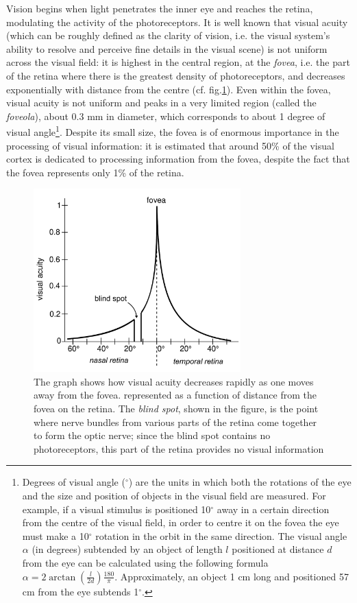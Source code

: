 \documentclass[11pt]{article}
\begin{document}
Vision begins when light penetrates the inner eye and reaches the retina, modulating the activity of the photoreceptors. It is well known that visual acuity (which can be roughly defined as the clarity of vision, i.e. the visual system's ability to resolve and perceive fine details in the visual scene) is not uniform across the visual field: it is highest in the central region, at the \textit{fovea}, i.e. the part of the retina where there is the greatest density of photoreceptors, and decreases exponentially with distance from the centre (cf. fig.\ref{fig1}). Even within the fovea, visual acuity is not uniform and peaks in a very limited region (called the \textit{foveola}), about 0.3 mm in diameter, which corresponds to about 1 degree of visual angle\footnote{Degrees of visual angle ($^{\circ}$) are the units in which both the rotations of the eye and the size and position of objects in the visual field are measured. For example, if a visual stimulus is positioned 10$^{\circ}$ away in a certain direction from the centre of the visual field, in order to centre it on the fovea the eye must make a 10$^{\circ}$ rotation in the orbit in the same direction. The visual angle $\alpha$ (in degrees) subtended by an object of length $l$ positioned at distance $d$ from the eye can be calculated using the following formula $\alpha = 2 \arctan(\frac{l}{2d}) \frac{180}{\pi}$. Approximately, an object 1 cm long and positioned 57 cm from the eye subtends 1$^{\circ}$.}. Despite its small size, the fovea is of enormous importance in the processing of visual information: it is estimated that around 50\% of the visual cortex is dedicated to processing information from the fovea, despite the fact that the fovea represents only 1\% of the retina.

\begin{figure}
\centering
\includegraphics[width=80mm]{fig1.pdf}
\caption{The graph shows how visual acuity decreases rapidly as one moves away from the fovea. represented as a function of distance from the fovea on the retina. The \textit{blind spot}, shown in the figure, is the point where nerve bundles from various parts of the retina come together to form the optic nerve; since the blind spot contains no photoreceptors, this part of the retina provides no visual information}
\label{fig1}
\end{figure}
\end{document}

